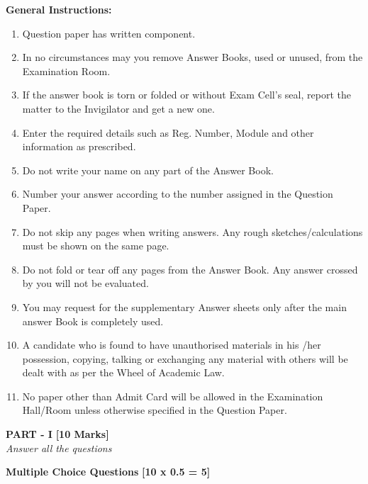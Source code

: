 \documentclass[12pt ,a4paper]{exam}
\begin{document}
	\textbf{General Instructions:}
	\begin{enumerate}
		\itemsep0em 
		\item Question paper has written component.
		\item In no circumstances may you remove Answer Books, used or unused, from the Examination Room.
		\item If the answer book is torn or folded or without Exam Cell’s seal, report the matter to the Invigilator and get a new one.
		\item Enter the required details such as Reg.  Number, Module and other information as prescribed.
		\item Do not write your name on any part of the Answer Book.
		\item Number your answer according to the number assigned in the Question Paper.
		\item Do not skip any pages when writing answers.  Any rough sketches/calculations must be shown on the same page.
		\item Do not fold or tear off any pages from the Answer Book. Any answer crossed by you will not be evaluated.
		\item You may request for the supplementary Answer sheets only after the main answer Book is completely used.
		\item A candidate who is found to have unauthorised materials in his /her possession, copying, talking or exchanging any material with others will be dealt with as per the Wheel of Academic Law.
		\item No paper other than Admit Card will be allowed in the Examination Hall/Room unless otherwise specified in the Question Paper.
	\end{enumerate}
	\pagebreak
	
	\begin{center}
		\noindent \textbf{PART - I} \textbf{ [10 Marks]}\\
		\noindent \textit{Answer all the questions} 
	\end{center}
	
	\vspace{0.5cm}
	
	\noindent \textbf{Multiple Choice Questions} \hfill \textbf{[10 x 0.5 = 5]}
	
\end{document}
